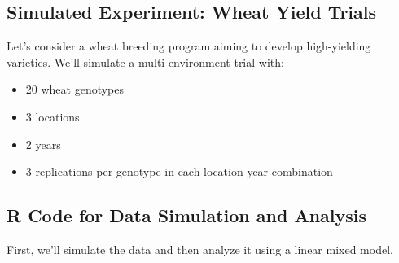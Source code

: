 \documentclass[12pt,a4paper]{article}
\begin{document}
\subsection{Simulated Experiment: Wheat Yield Trials}

Let's consider a wheat breeding program aiming to develop high-yielding varieties. We'll simulate a multi-environment trial with:

\begin{itemize}
    \item 20 wheat genotypes
    \item 3 locations
    \item 2 years
    \item 3 replications per genotype in each location-year combination
\end{itemize}

\subsection{R Code for Data Simulation and Analysis}

First, we'll simulate the data and then analyze it using a linear mixed model.
\end{document}
